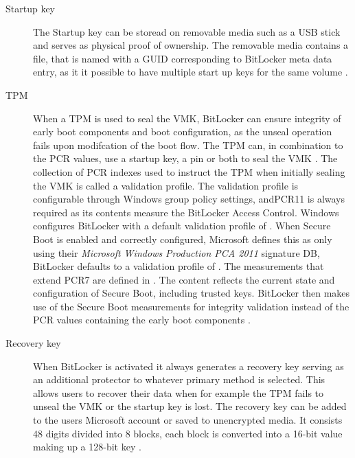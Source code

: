 \begin{description}
    \item[Startup key] The Startup key can be storead on removable media such as a \ac{USB} stick and serves as physical proof of ownership.
        The removable media contains a  file, that is named with a \ac{GUID} corresponding to BitLocker meta data entry, as it it possible to have multiple start up keys for the same volume \cite[Section 2.6]{bde-format-spec}\cite{microsoft-windows-prepare-your-org}.

    \item[TPM]
        When a \ac{TPM} is used to seal the \ac{VMK}, BitLocker can ensure integrity of early boot components and boot configuration, as the unseal operation fails upon modifcation of the boot flow.
        The \ac{TPM} can, in combination to the \ac{PCR} values, use a startup key, a pin or both to seal the \ac{VMK} \cite{microsoft-bitlocker-countermeasures}.
        The collection of \ac{PCR} indexes used to instruct the \ac{TPM} when initially sealing the \ac{VMK} is called a validation profile.
        The validation profile is configurable through Windows group policy settings, and\ac{PCR}11 is always required as its contents measure the BitLocker Access Control.
        Windows configures BitLocker with a default validation profile of  \cite{microsoft-windows-bitlocker-group-policy-settings}.
        When Secure Boot is enabled and correctly configured, Microsoft defines this as only using their \emph{Microsoft Windows Production PCA 2011} signature \ac{DB}, BitLocker defaults to a validation profile of  \cite{microsoft-pcr7-binding}.
        The measurements that extend \ac{PCR}7 are defined in \cite{microsoft-trusted-execution-environment}.
        The content reflects the current state and configuration of Secure Boot, including trusted keys.
        BitLocker then makes use of the Secure Boot measurements for integrity validation instead of the \ac{PCR} values containing the early boot components \cite{microsoft-windows-bitlocker-group-policy-settings}.

    \item[Recovery key]
        When BitLocker is activated it always generates a recovery key serving as an additional protector to whatever primary method is selected.
        This allows users to recover their data when for example the \ac{TPM} fails to unseal the \ac{VMK} or the startup key is lost.
        The recovery key can be added to the users Microsoft account or saved to unencrypted media.
        It consists 48 digits divided into 8 blocks, each block is converted into a 16-bit value making up a 128-bit key \cite[Section 2.4]{bde-format-spec}.


\end{description}
